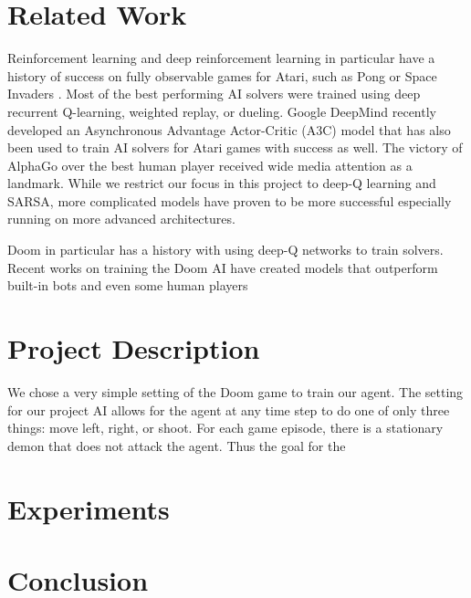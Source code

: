\documentclass[letterpaper]{article} %
\begin{document}
\section{Related Work}
Reinforcement learning and deep reinforcement learning in particular have a history of success on fully observable games for Atari, such as Pong or Space Invaders \cite{playing_atari}. Most of the best performing AI solvers were trained using deep recurrent Q-learning, weighted replay, or dueling. Google DeepMind recently developed an Asynchronous Advantage Actor-Critic (A3C) model that has also been used to train AI solvers for Atari games with success as well. The victory of AlphaGo over the best human player received wide media attention as a landmark. While we restrict our focus in this project to deep-Q learning and SARSA, more complicated models have proven to be more successful especially running on more advanced architectures. 

Doom in particular has a history with using deep-Q networks to train solvers. Recent works on training the Doom AI have created models that outperform built-in bots and even some human players  


\section{Project Description}
We chose a very simple setting of the Doom game to train our agent. The setting for our project AI allows for the agent at any time step to do one of only three things: move left, right, or shoot. For each game episode, there is a stationary demon that does not attack the agent. Thus the goal for the 


\section{Experiments}

\section{Conclusion}

\medskip
\printbibliography
\end{document}
